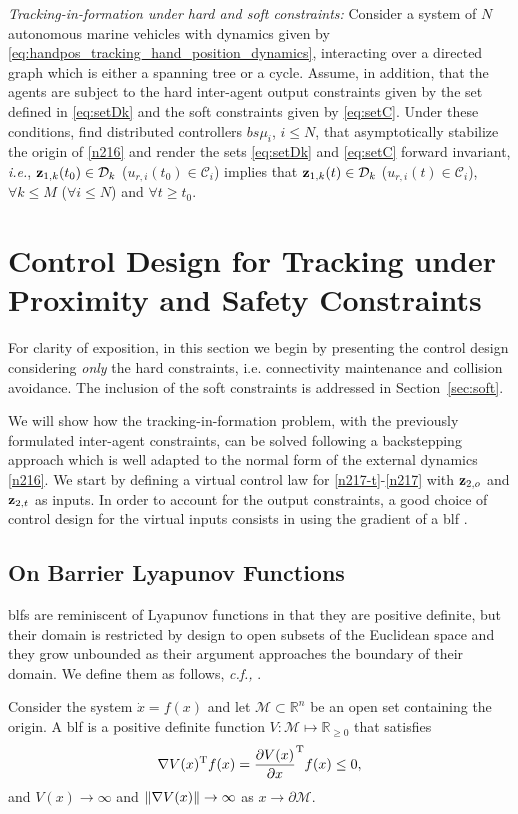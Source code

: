 {\it Tracking-in-formation under hard and soft constraints:} Consider a system of $N$ autonomous marine vehicles with dynamics given by \eqref{eq:handpos_tracking_hand_position_dynamics}, interacting over a directed graph which is either a spanning tree or a cycle.
Assume, in addition, that the agents are subject to the hard inter-agent output constraints given by the set defined in \eqref{eq:setDk} and the soft constraints given by \eqref{eq:setC}.
Under these conditions, find distributed controllers $bs{\mu}_i$, $i\leq N$, that asymptotically stabilize the origin of \eqref{n216} and render the sets \eqref{eq:setDk} and \eqref{eq:setC} forward invariant, \emph{i.e.}, $\mathbf{z}_{1, k}(t_0)\in\mathcal{D}_k$ ($u_{r, i}(t_0)\in\mathcal{C}_i$) implies that $\mathbf{z}_{1, k}(t)\in \mathcal{D}_k$ ($u_{r, i}(t)\in\mathcal{C}_i$), $\forall k\leq M$ ($\forall i\leq N$) and $\forall t\geq t_0$.

\section{Control Design for Tracking under Proximity and Safety Constraints}
\label{sec:ctrl}

For clarity of exposition, in this section we begin by presenting the control design considering \emph{only} the hard constraints, i.e. connectivity maintenance and collision avoidance. The inclusion of the soft constraints is addressed in Section~\ref{sec:soft}.

We will show how the tracking-in-formation problem, with the previously formulated inter-agent constraints, can be solved following a backstepping approach which is well adapted to the normal form of the external dynamics \eqref{n216}. We start by defining a virtual control law for \eqref{n217-t}-\eqref{n217} with $\mathbf{z}_{2, o}$ and $\mathbf{z}_{2, t}$ as inputs. 
In order to account for the output constraints, a good choice of control design for the virtual inputs consists in using the gradient of a \acrfull{blf} \cite{tee_barrier_2009}.

\subsection{On Barrier Lyapunov Functions}

\Glspl{blf} are reminiscent of Lyapunov functions in that they are positive definite, but their domain is restricted by design to open subsets of the Euclidean space and they grow unbounded as their argument approaches the boundary of their domain.
We define them as follows, \emph{c.f.,} \cite{tee_barrier_2009}.
\begin{dfn}[BLF]\label{def:TAC-barrier-function}
	Consider the system $\dot{x} = f(x)$ and let $\mathcal M \subset \mathbb{R}^n$ be an open set containing the origin.
	A \gls{blf} is a positive definite function $V : \mathcal M \mapsto \mathbb{R}_{\geq 0}$ that satisfies
	\[%
	\nabla V(x)\T f(x) = \frac{\partial V(x)}{\partial x}\T f(x)\leq 0,\]	
	and $V(x) \rightarrow \infty$ and $\left\|\nabla V(x)\right\| \rightarrow \infty$ as $x \rightarrow \partial \mathcal M$. 
\end{dfn}

